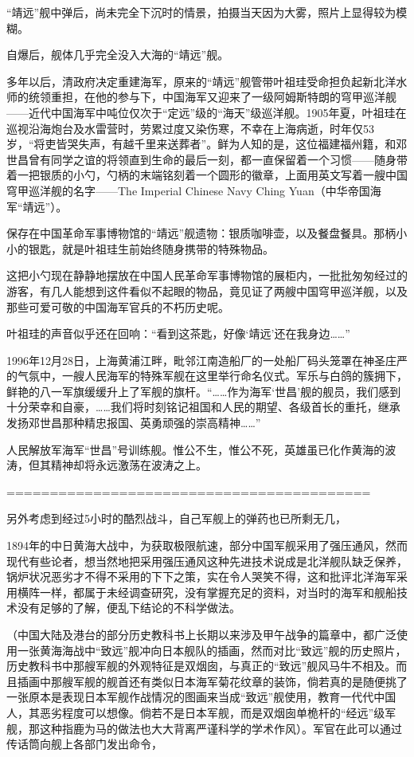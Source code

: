 \documentclass[12pt,UTF8]{ctexbook}
\begin{document}
“靖远”舰中弹后，尚未完全下沉时的情景，拍摄当天因为大雾，照片上显得较为模糊。

自爆后，舰体几乎完全没入大海的“靖远”舰。

多年以后，清政府决定重建海军，原来的“靖远”舰管带叶祖珪受命担负起新北洋水师的统领重担，在他的参与下，中国海军又迎来了一级阿姆斯特朗的穹甲巡洋舰——近代中国海军中吨位仅次于“定远”级的“海天”级巡洋舰。1905年夏，叶祖珪在巡视沿海炮台及水雷营时，劳累过度又染伤寒，不幸在上海病逝，时年仅53岁，“将吏皆哭失声，有越千里来送葬者”。鲜为人知的是，这位福建福州籍，和邓世昌曾有同学之谊的将领直到生命的最后一刻，都一直保留着一个习惯——随身带着一把银质的小勺，勺柄的末端铭刻着一个圆形的徽章，上面用英文写着一艘中国穹甲巡洋舰的名字——The Imperial Chinese Navy Ching Yuan（中华帝国海军“靖远”）。

保存在中国革命军事博物馆的“靖远”舰遗物：银质咖啡壶，以及餐盘餐具。那柄小小的银匙，就是叶祖珪生前始终随身携带的特殊物品。

这把小勺现在静静地摆放在中国人民革命军事博物馆的展柜内，一批批匆匆经过的游客，有几人能想到这件看似不起眼的物品，竟见证了两艘中国穹甲巡洋舰，以及那些可爱可敬的中国海军官兵的不朽历史呢。

叶祖珪的声音似乎还在回响：“看到这茶匙，好像‘靖远’还在我身边……”

1996年12月28日，上海黄浦江畔，毗邻江南造船厂的一处船厂码头笼罩在神圣庄严的气氛中，一艘人民海军的特殊军舰在这里举行命名仪式。军乐与白鸽的簇拥下，鲜艳的八一军旗缓缓升上了军舰的旗杆。“……作为海军‘世昌’舰的舰员，我们感到十分荣幸和自豪，……我们将时刻铭记祖国和人民的期望、各级首长的重托，继承发扬邓世昌那种精忠报国、英勇顽强的崇高精神……”

人民解放军海军“世昌”号训练舰。惟公不生，惟公不死，英雄虽已化作黄海的波涛，但其精神却将永远激荡在波涛之上。

==========================================

另外考虑到经过5小时的酷烈战斗，自己军舰上的弹药也已所剩无几，

1894年的中日黄海大战中，为获取极限航速，部分中国军舰采用了强压通风，然而现代有些论者，想当然地把采用强压通风这种先进技术说成是北洋舰队缺乏保养，锅炉状况恶劣才不得不采用的下下之策，实在令人哭笑不得，这和批评北洋海军采用横阵一样，都属于未经调查研究，没有掌握充足的资料，对当时的海军和舰船技术没有足够的了解，便乱下结论的不科学做法。

（中国大陆及港台的部分历史教科书上长期以来涉及甲午战争的篇章中，都广泛使用一张黄海海战中“致远”舰冲向日本舰队的插画，然而对比“致远”舰的历史照片，历史教科书中那艘军舰的外观特征是双烟囱，与真正的“致远”舰风马牛不相及。而且插画中那艘军舰的舰首还有类似日本海军菊花纹章的装饰，倘若真的是随便挑了一张原本是表现日本军舰作战情况的图画来当成“致远”舰使用，教育一代代中国人，其恶劣程度可以想像。倘若不是日本军舰，而是双烟囱单桅杆的“经远”级军舰，那这种指鹿为马的做法也大大背离严谨科学的学术作风）。军官在此可以通过传话筒向舰上各部门发出命令，
\end{document}
